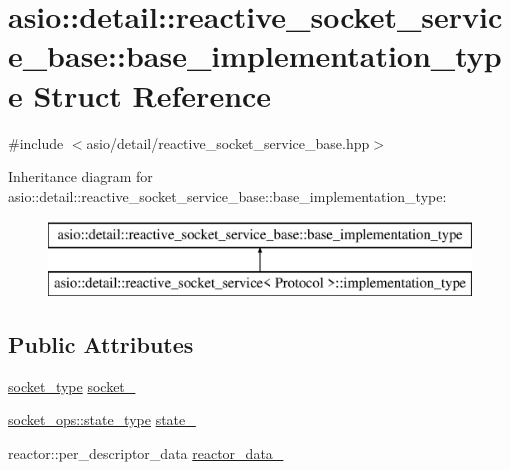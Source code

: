\hypertarget{structasio_1_1detail_1_1reactive__socket__service__base_1_1base__implementation__type}{}\section{asio\+:\+:detail\+:\+:reactive\+\_\+socket\+\_\+service\+\_\+base\+:\+:base\+\_\+implementation\+\_\+type Struct Reference}
\label{structasio_1_1detail_1_1reactive__socket__service__base_1_1base__implementation__type}


{\ttfamily \#include $<$asio/detail/reactive\+\_\+socket\+\_\+service\+\_\+base.\+hpp$>$}

Inheritance diagram for asio\+:\+:detail\+:\+:reactive\+\_\+socket\+\_\+service\+\_\+base\+:\+:base\+\_\+implementation\+\_\+type\+:\begin{figure}[H]
\begin{center}
\leavevmode
\includegraphics[height=2.000000cm]{structasio_1_1detail_1_1reactive__socket__service__base_1_1base__implementation__type}
\end{center}
\end{figure}
\subsection*{Public Attributes}
\begin{DoxyCompactItemize}
\item 
\hyperlink{namespaceasio_1_1detail_a6798c771dd84b79798b1a08150706ea9}{socket\+\_\+type} \hyperlink{structasio_1_1detail_1_1reactive__socket__service__base_1_1base__implementation__type_ac3ee4518bc9fc746904070cfe607513c}{socket\+\_\+}
\item 
\hyperlink{namespaceasio_1_1detail_1_1socket__ops_a5ce32ee297edef8833113ea35a933054}{socket\+\_\+ops\+::state\+\_\+type} \hyperlink{structasio_1_1detail_1_1reactive__socket__service__base_1_1base__implementation__type_a53bbe651bd173ef81d6627468ebabc2d}{state\+\_\+}
\item 
reactor\+::per\+\_\+descriptor\+\_\+data \hyperlink{structasio_1_1detail_1_1reactive__socket__service__base_1_1base__implementation__type_a2d17d5782c98bd1c61e91dfa67083edb}{reactor\+\_\+data\+\_\+}
\end{DoxyCompactItemize}


